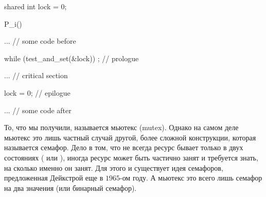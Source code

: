 \begin{ccode}
  shared int lock = 0;

  P_i() {
    ... // some code before

    while (test_and_set(&lock)) {}; // prologue

    ... // critical section

    lock = 0; // epilogue

    ... // some code after
  }
\end{ccode}

То, что мы получили, называется мьютекс (mutex). Однако на самом деле мьютекс
это лишь частный случай другой, более сложной конструкции, которая называется
семафор. Дело в том, что не всегда ресурс бывает только в двух состояниях
( или ), иногда ресурс может быть частично
занят и требуется знать, на сколько именно он занят. Для этого и существует идея
семафоров, предложенная Дейкстрой еще в \(1965\)-ом году. А мьютекс это всего
лишь семафор на два значения (или бинарный семафор).
